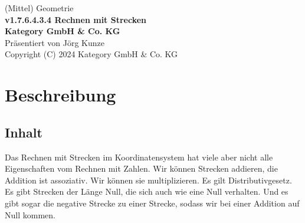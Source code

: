 \documentclass[a4paper]{amsart}
\theoremstyle{definition}
\begin{document}
\begin{titlepage}
\centering
{\huge
(Mittel) Geometrie\\[1cm]
\textbf{v1.7.6.4.3.4 Rechnen mit Strecken}
}\\[1cm]

\textbf{Kategory GmbH \& Co. KG}\\
Präsentiert von Jörg Kunze\\
Copyright (C) 2024 Kategory GmbH \& Co. KG

\end{titlepage}

%

\newpage

\section*{Beschreibung}

\subsection*{Inhalt}
Das Rechnen mit Strecken im Koordinatensystem hat viele aber nicht alle Eigenschaften vom Rechnen mit Zahlen. Wir können Strecken addieren, die Addition ist assoziativ. Wir können sie multiplizieren. Es gilt Distributivgesetz. Es gibt Strecken der Länge Null, die sich auch wie eine Null verhalten. Und es gibt sogar die negative Strecke zu einer Strecke, sodass wir bei einer Addition auf Null kommen.
\end{document}
